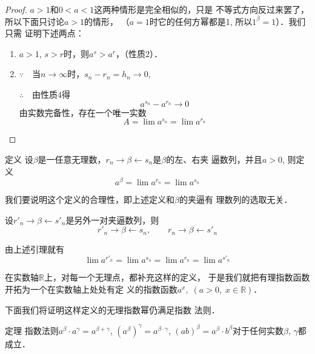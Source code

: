 \begin{proof}
  $a>1$和$0<a<1$这两种情形是完全相似的，只是
不等式方向反过来罢了，所以下面只讨论$a>1$的情形，
（$a=1$时它的任何方幂都是1, 所以$1^{\beta}=1$）．我们只需
证明下述两点：
\begin{enumerate}
  \item $a>1$, $s>r$时，则$a^s>a^r$，（性质2）．
  \item $\because\quad $当$n\to\infty$时，$s_n-r_n=h_n\to 0$,
  
  $\therefore\quad $由性质4得
\[  a^{s_n}-a^{r_n}\to 0\]
  由实数完备性，存在一个唯一实数
 \[ A=\lim a^{s_n}=\lim a^{r_n}\]
\end{enumerate}
\end{proof}

\begin{blk}{定义}
  设$\beta$是一任意无理数，$r_n\to\beta\leftarrow s_n$是$\beta$的左、右夹
逼数列，并且$a>0$, 则定义
\[a^{\beta}=\lim a^{r_n}=\lim a^{s_n}\]
\end{blk}


我们要说明这个定义的合理性，即上述定义和$\beta$的夹逼有
理数列的选取无关．

设$r'_n\to\beta\leftarrow s'_n$是另外一对夹逼数列，则
\[r'_n\to\beta \leftarrow s_n,\qquad r_n\to\beta\leftarrow s'_n\]

由上述引理就有
\[\lim a^{r'_n}=\lim a^{s_n}=\lim a^{r_n}=\lim a^{s'_n}\]

在实数轴$\mathbb{R}$上，对每一个无理点，都补充这样的定义，
于是我们就把有理指数函数开拓为一个在实数轴上处处有定
义的指数函数$a^x,\; (a>0,\; x\in\mathbb{R})$．

下面我们将证明这样定义的无理指数幂仍满足指数
法则．

\begin{blk}{定理}
  指数法则$a^{\beta}\cdot a^{\gamma}=a^{\beta+\gamma}$, $\left(a^{\beta}\right)^{\gamma}=a^{\beta\cdot \gamma}$, $(ab)^{\beta}=a^{\beta}\cdot b^{\beta}$对于任何实数$\beta$, $\gamma$都成立．
\end{blk}
 
